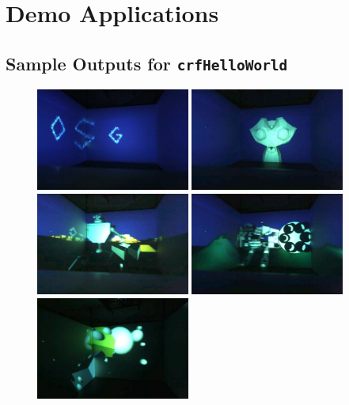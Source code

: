 \chapter{Demo Applications}
\label{sec:appendixDemo}

\section{Sample Outputs for \texttt{crfHelloWorld}}
\label{sec:appendixHelloWorld}
\begin{figure}[H]
	\centering
	\includegraphics[width=0.45\textwidth]{../figures/fotos/demo_helloWorld}
	\includegraphics[width=0.45\textwidth]{../figures/fotos/demo_blender1}
	\includegraphics[width=0.45\textwidth]{../figures/fotos/demo_blender7}
	\includegraphics[width=0.45\textwidth]{../figures/fotos/demo_blender8}
	\includegraphics[width=0.45\textwidth]{../figures/fotos/demo_blender9}

\end{figure}
